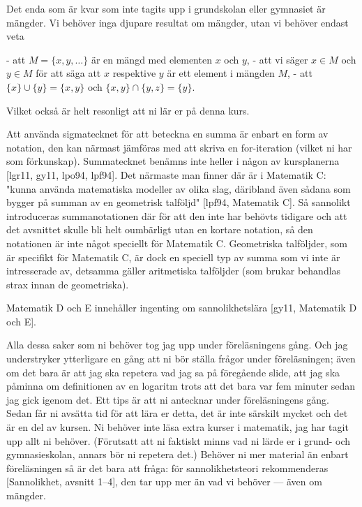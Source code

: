 Det enda som är kvar som inte tagits upp i grundskolan eller gymnasiet 
är mängder. Vi behöver inga djupare resultat om mängder, utan vi behöver 
endast veta

    - att $M = \{x, y, \ldots\}$ är en mängd med elementen $x$ och $y$,
    - att vi säger $x \in M$ och $y \in M$ för att säga att $x$ 
      respektive $y$ är ett element i mängden $M$,
    - att $\{x\} \cup \{y\} = \{x, y\}$ och $\{x, y\} \cap \{y, z\} 
      = \{y\}$.

Vilket också är helt resonligt att ni lär er på denna kurs.

Att använda sigmatecknet för att beteckna en summa är enbart en form av 
notation, den kan närmast jämföras med att skriva en for-iteration 
(vilket ni har som förkunskap).  Summatecknet benämns inte heller 
i någon av kursplanerna [lgr11, gy11, lpo94, lpf94]. Det närmaste man 
finner där är i Matematik C: "kunna använda matematiska modeller av 
olika slag, däribland även sådana som bygger på summan av en geometrisk 
talföljd" [lpf94, Matematik C].  Så sannolikt introduceras 
summanotationen där för att den inte har behövts tidigare och att det 
avsnittet skulle bli helt oumbärligt utan en kortare notation, så den 
notationen är inte något speciellt för Matematik C.  Geometriska 
talföljder, som är specifikt för Matematik C, är dock en speciell typ av 
summa som vi inte är intresserade av, detsamma gäller aritmetiska 
talföljder (som brukar behandlas strax innan de geometriska).

Matematik D och E innehåller ingenting om sannolikhetslära [gy11, 
Matematik D och E].

Alla dessa saker som ni behöver tog jag upp under föreläsningens gång.  
Och jag understryker ytterligare en gång att ni bör ställa frågor under 
föreläsningen; även om det bara är att jag ska repetera vad jag sa på 
föregående slide, att jag ska påminna om definitionen av en logaritm 
trots att det bara var fem minuter sedan jag gick igenom det. Ett tips 
är att ni antecknar under föreläsningens gång. Sedan får ni avsätta tid 
för att lära er detta, det är inte särskilt mycket och det är en del av 
kursen.  Ni behöver inte läsa extra kurser i matematik, jag har tagit 
upp allt ni behöver.  (Förutsatt att ni faktiskt minns vad ni lärde er 
i grund- och gymnasieskolan, annars bör ni repetera det.) Behöver ni mer 
material än enbart föreläsningen så är det bara att fråga: för 
sannolikhetsteori rekommenderas [Sannolikhet, avsnitt 1--4], den tar upp 
mer än vad vi behöver --- även om mängder.

